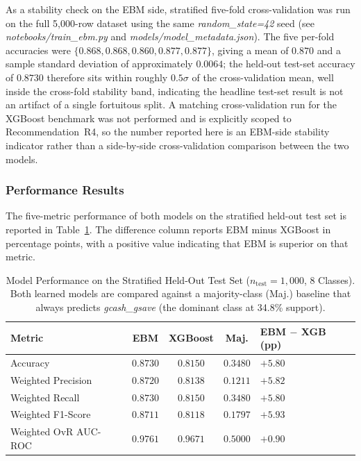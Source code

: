 \documentclass{icsthesis}
\begin{document}
\begin{mainmatter}
					As a stability check on the EBM side, stratified five-fold cross-validation was run on the full 5{,}000-row dataset using the same \emph{random\_state=42} seed (see \emph{notebooks/train\_ebm.py} and \emph{models/model\_metadata.json}). The five per-fold accuracies were $\{0.868, 0.868, 0.860, 0.877, 0.877\}$, giving a mean of $0.870$ and a sample standard deviation of approximately $0.0064$; the held-out test-set accuracy of $0.8730$ therefore sits within roughly $0.5\sigma$ of the cross-validation mean, well inside the cross-fold stability band, indicating the headline test-set result is not an artifact of a single fortuitous split. A matching cross-validation run for the XGBoost benchmark was not performed and is explicitly scoped to Recommendation~R4, so the number reported here is an EBM-side stability indicator rather than a side-by-side cross-validation comparison between the two models.

				\subsubsection{Performance Results}
					The five-metric performance of both models on the stratified held-out test set is reported in Table~\ref{tab:perf}. The difference column reports EBM minus XGBoost in percentage points, with a positive value indicating that EBM is superior on that metric.

					\begin{table}[h]
					\vspace{4ex}
					\centering
					\caption{Model Performance on the Stratified Held-Out Test Set ($n_{\mathrm{test}} = 1{,}000$, 8 Classes). Both learned models are compared against a majority-class (Maj.) baseline that always predicts \emph{gcash\_gsave} (the dominant class at 34.8\% support).}
					\label{tab:perf}
					\footnotesize
					\begin{tabular}{|p{2.5cm}|c|c|c|p{1.3cm}|}
						\hline
						\textbf{Metric} & \textbf{EBM} & \textbf{XGBoost} & \textbf{Maj.} & \textbf{EBM $-$ XGB (pp)} \\
						\hline
						Accuracy & $0.8730$ & $0.8150$ & $0.3480$ & $+5.80$ \\
						Weighted Precision & $0.8720$ & $0.8138$ & $0.1211$ & $+5.82$ \\
						Weighted Recall & $0.8730$ & $0.8150$ & $0.3480$ & $+5.80$ \\
						Weighted F1-Score & $0.8711$ & $0.8118$ & $0.1797$ & $+5.93$ \\
						Weighted OvR AUC-ROC & $0.9761$ & $0.9671$ & $0.5000$ & $+0.90$ \\
						\hline
					\end{tabular}


\end{table}
\end{mainmatter}
\end{document}
